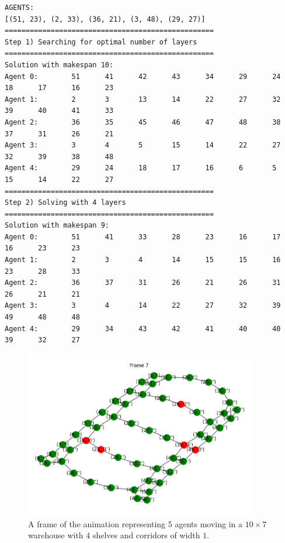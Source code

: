 \documentclass[12pt, a4paper, hidelinks]{article}
\numberwithin{equation}{section}
\begin{document}
\begin{lstlisting}[label={lst:warehouse}]
AGENTS:
[(51, 23), (2, 33), (36, 21), (3, 48), (29, 27)]
==================================================
Step 1) Searching for optimal number of layers
==================================================
Solution with makespan 10:
Agent 0:        51      41      42      43      34      29      24      18      17      16      23
Agent 1:        2       3       13      14      22      27      32      39      40      41      33
Agent 2:        36      35      45      46      47      48      38      37      31      26      21
Agent 3:        3       4       5       15      14      22      27      32      39      38      48
Agent 4:        29      24      18      17      16      6       5       15      14      22      27
==================================================
Step 2) Solving with 4 layers
==================================================
Solution with makespan 9:
Agent 0:        51      41      33      28      23      16      17      16      23      23
Agent 1:        2       3       4       14      15      15      16      23      28      33
Agent 2:        36      37      31      26      21      26      31      26      21      21
Agent 3:        3       4       14      22      27      32      39      49      48      48
Agent 4:        29      34      43      42      41      40      40      39      32      27
\end{lstlisting}
\begin{figure}
    \centering
    \includegraphics[width=0.9\textwidth]{warehouse.png}
    \caption{A frame of the animation representing 5 agents moving in a $10 \times 7$ warehouse with $4$ shelves and corridors of width $1$.}\label{fig:warehouse}
\end{figure}
\end{document}
